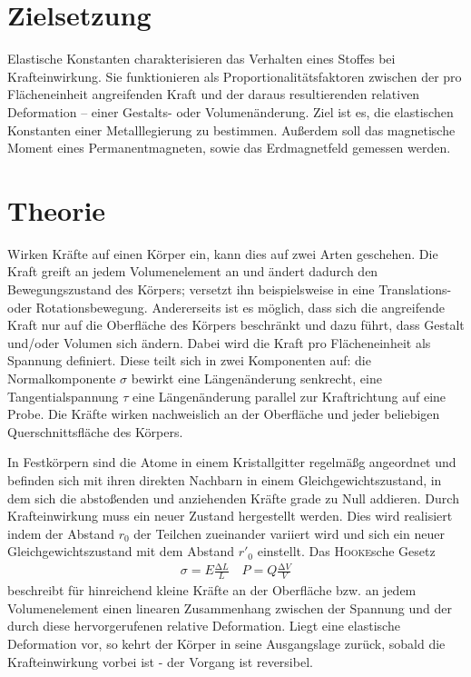 \section{Zielsetzung}
Elastische Konstanten charakterisieren das Verhalten eines Stoffes bei Krafteinwirkung.
Sie funktionieren als Proportionalitätsfaktoren zwischen der pro Flächeneinheit angreifenden Kraft und der daraus resultierenden relativen Deformation -- einer Gestalts- oder Volumenänderung. 
Ziel ist es, die elastischen Konstanten einer Metalllegierung zu bestimmen. Außerdem soll das magnetische Moment eines Permanentmagneten, sowie das Erdmagnetfeld gemessen werden.
\section{Theorie}
\label{sec:Theorie}
Wirken Kräfte auf einen Körper ein, kann dies auf zwei Arten geschehen. Die Kraft greift an jedem Volumenelement an und ändert dadurch den Bewegungszustand des Körpers; versetzt ihn beispielsweise in eine Translations- oder Rotationsbewegung. 
Andererseits ist es möglich, dass sich die angreifende Kraft nur auf die Oberfläche des Körpers beschränkt und dazu führt, dass Gestalt und/oder Volumen sich ändern. 
Dabei wird die Kraft pro Flächeneinheit als Spannung definiert. 
Diese teilt sich in zwei Komponenten auf: die Normalkomponente $\sigma$ bewirkt eine Längenänderung senkrecht, eine Tangentialspannung $\tau$ eine Längenänderung parallel zur Kraftrichtung auf eine Probe. 
Die Kräfte wirken nachweislich an der Oberfläche und jeder beliebigen Querschnittsfläche des Körpers. 

In Festkörpern sind die Atome in einem Kristallgitter regelmäßg angeordnet und befinden sich mit ihren direkten Nachbarn in einem Gleichgewichtszustand, in dem sich die abstoßenden und anziehenden Kräfte grade zu Null addieren. 
Durch Krafteinwirkung muss ein neuer Zustand hergestellt werden. 
Dies wird realisiert indem der Abstand $r_0$ der Teilchen zueinander variiert wird und sich ein neuer Gleichgewichtszustand mit dem Abstand $r'_0$ einstellt.
Das \textsc{Hooke}sche Gesetz
\begin{align}
\sigma=E\frac{\mathup{\Delta}{L}}{L}  \quad P=Q\frac{\mathup{\Delta}{V}}{V}
\label{eq:hooke}
\end{align}
beschreibt für hinreichend kleine Kräfte an der Oberfläche bzw. an jedem Volumenelement einen linearen Zusammenhang zwischen der Spannung und der durch diese hervorgerufenen relative Deformation.
Liegt eine elastische Deformation vor, so kehrt der Körper in seine Ausgangslage zurück, sobald die Krafteinwirkung vorbei ist - der Vorgang ist reversibel. 

